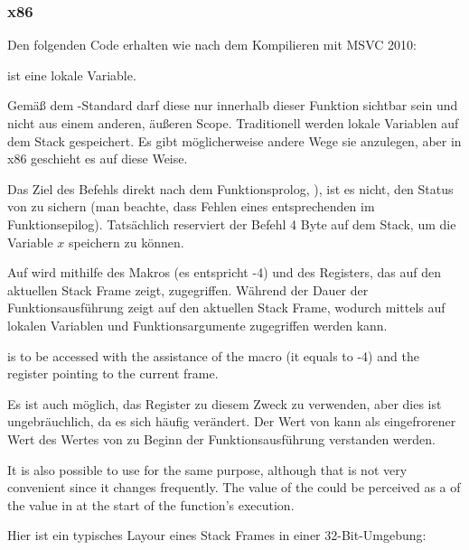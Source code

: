 \subsubsection{x86}

Den folgenden Code erhalten wie nach dem Kompilieren mit MSVC 2010:



 ist eine lokale Variable.

Gemäß dem \CCpp-Standard darf diese nur innerhalb dieser Funktion sichtbar sein und nicht aus einem anderen, äußeren Scope.
Traditionell werden lokale Variablen auf dem Stack gespeichert.
Es gibt möglicherweise andere Wege sie anzulegen, aber in x86 geschieht es auf diese Weise.


Das Ziel des Befehls direkt nach dem Funktionsprolog, ), ist es nicht, den Status von \ECX zu sichern
(man beachte, dass Fehlen eines entsprechenden  im Funktionsepilog).
Tatsächlich reserviert der Befehl 4 Byte auf dem Stack, um die Variable $x$ speichern zu können.

\label{stack_frame}
Auf  wird mithilfe des  Makros (es entspricht -4) und des \EBP Registers, das auf den aktuellen Stack Frame zeigt, zugegriffen. 
Während der Dauer der Funktionsausführung zeigt \EBP auf den aktuellen \gls{Stack Frame}, wodurch mittels  auf lokalen Variablen und Funktionsargumente zugegriffen werden kann.

 is to be accessed with the assistance of the  macro (it equals to -4) and the \EBP register pointing to the current frame.

Es ist auch möglich, das \ESP Register zu diesem Zweck zu verwenden, aber dies ist ungebräuchlich, da es sich häufig verändert.
Der Wert von \EBP kann als eingefrorener Wert des Wertes von \ESP zu Beginn der Funktionsausführung verstanden werden.

It is also possible to use \ESP for the same purpose, although that is not very convenient since it changes frequently.
The value of the \EBP could be perceived as a  of the value in \ESP at the start of the function's execution.

Hier ist ein typisches Layour eines Stack Frames in einer 32-Bit-Umgebung:

